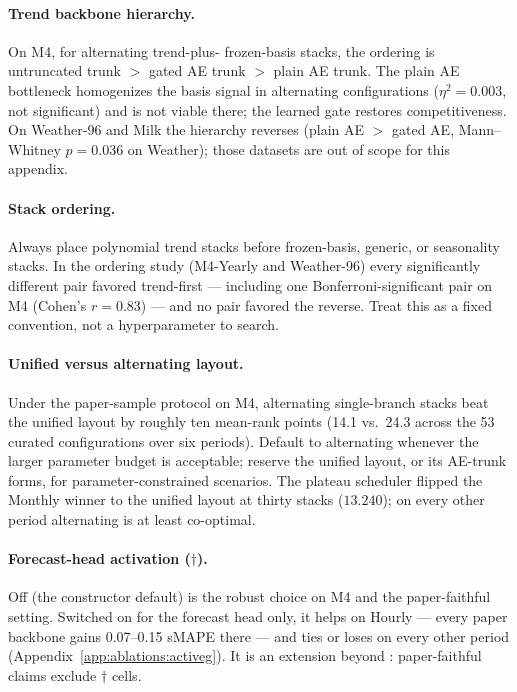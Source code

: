 \paragraph{Trend backbone hierarchy.} On M4, for alternating trend-plus-
frozen-basis stacks, the ordering is untruncated trunk $>$ gated AE trunk
$>$ plain AE trunk. The plain AE bottleneck homogenizes the basis signal in
alternating configurations ($\eta^2 = 0.003$, not significant) and is not
viable there; the learned gate restores competitiveness. On Weather-96 and
Milk the hierarchy reverses (plain AE $>$ gated AE, Mann--Whitney
$p = 0.036$ on Weather); those datasets are out of scope for this appendix.

\paragraph{Stack ordering.} Always place polynomial trend stacks before
frozen-basis, generic, or seasonality stacks. In the ordering study
(M4-Yearly and Weather-96) every significantly different pair favored
trend-first --- including one Bonferroni-significant pair on M4
(Cohen's $r = 0.83$) --- and no pair favored the reverse. Treat this as a
fixed convention, not a hyperparameter to search.

\paragraph{Unified versus alternating layout.} Under the paper-sample
protocol on M4, alternating single-branch stacks beat the unified layout by
roughly ten mean-rank points (14.1 vs.\ 24.3 across the 53 curated
configurations over six periods). Default to alternating whenever the
larger parameter budget is acceptable; reserve the unified layout, or its
AE-trunk forms, for parameter-constrained scenarios. The plateau scheduler
flipped the Monthly winner to the unified layout at thirty stacks
($13.240$); on every other period alternating is at least co-optimal.

\paragraph{Forecast-head activation ($\dagger$).} Off (the constructor
default) is the robust choice on M4 and the paper-faithful setting.
Switched on for the forecast head only, it helps on Hourly --- every paper
backbone gains 0.07--0.15 sMAPE there --- and ties or loses on every other
period (Appendix~\ref{app:ablations:activeg}). It is an extension beyond
\citet{oreshkin2020nbeats}: paper-faithful claims exclude $\dagger$ cells.

